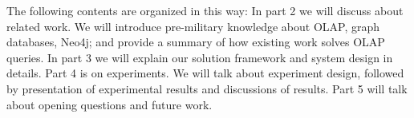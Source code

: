The following contents are organized in this way:
In part 2 we will discuss about related work. We will introduce pre-military knowledge about  OLAP, graph databases, Neo4j; and provide a summary of how existing work solves OLAP queries.
In part 3 we will explain our solution framework and system design in details. 
Part 4 is on experiments. We will talk about experiment design, followed by presentation of experimental results and discussions of results.
Part 5 will talk about opening questions and future work.

